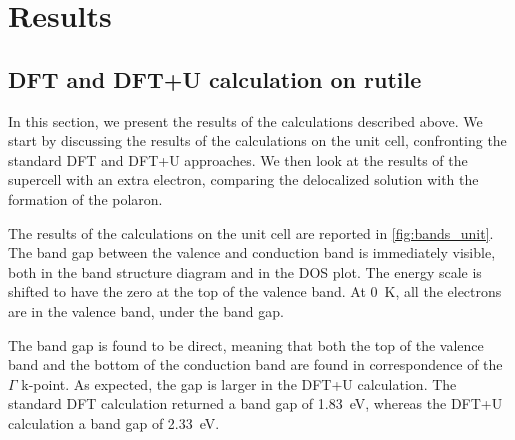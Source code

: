 \section{Results}
\subsection{DFT and DFT+U calculation on rutile}
In this section, we present the results of the calculations described above. We start by discussing the results of the calculations on the unit cell, confronting the standard DFT and DFT+U approaches. We then look at the results of the supercell with an extra electron, comparing the delocalized solution with the formation of the polaron.

The results of the calculations on the unit cell are reported in \cref{fig:bands_unit}. The band gap between the valence and conduction band is immediately visible, both in the band structure diagram and in the DOS plot. The energy scale is shifted to have the zero at the top of the valence band. At \SI{0}{\kelvin}, all the electrons are in the valence band, under the band gap.

The band gap is found to be direct, meaning that both the top of the valence band and the bottom of the conduction band are found in correspondence of the $\Gamma$ k-point. As expected, the gap is larger in the DFT+U calculation. The standard DFT calculation returned a band gap of \SI{1.83}{eV}, whereas the DFT+U calculation a band gap of \SI{2.33}{eV}.


